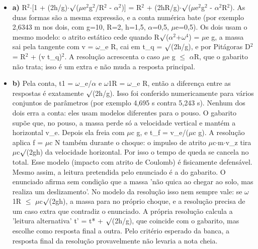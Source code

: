 \documentclass{article}%
\begin{document}
\begin{itemize}%
\item%
\textbf{a)} R$^2$$\cdot${[}1 + (2h/g)$\cdot$$\surd$($\mu$e$^2$g$^2$/R$^2$ - $\alpha$$^2$){]} = R$^2$ + (2hR/g)$\cdot$$\surd$($\mu$e$^2$g$^2$ - $\alpha$$^2$R$^2$). As duas formas são a mesma expressão, e a conta numérica bate (por exemplo 2,6343 m nos dois, com g=10, R=2, h=1,5, $\alpha$=0,5, $\mu$e=0,5). Os dois usam o mesmo modelo: o atrito estático cede quando R$\surd$($\alpha$$^2$+$\omega$$^{4}$) = $\mu$e g, a massa sai pela tangente com v = $\omega$\_e R, cai em t\_q = $\surd$(2h/g), e por Pitágoras D$^2$ = R$^2$ + (v t\_q)$^2$. A resolução acrescenta o caso $\mu$e g $\leq$ $\alpha$R, que o gabarito não trata; isso é um extra e não muda a resposta principal.%
\item%
\textbf{b)} Pela conta, t1 = $\omega$\_e/$\alpha$ e $\omega$1R = $\omega$\_e R, então a diferença entre as respostas é exatamente $\surd$(2h/g). Isso foi conferido numericamente para vários conjuntos de parâmetros (por exemplo 4,695 s contra 5,243 s). Nenhum dos dois erra a conta: eles usam modelos diferentes para o pouso. O gabarito supõe que, no pouso, a massa perde só a velocidade vertical e mantém a horizontal v\_e. Depois ela freia com $\mu$c g, e t\_f = v\_e/($\mu$c g). A resolução aplica f = $\mu$c N também durante o choque: o impulso de atrito $\mu$c$\cdot$m$\cdot$v\_z tira $\mu$c$\surd$(2gh) da velocidade horizontal. Por isso o tempo de queda se cancela no total. Esse modelo (impacto com atrito de Coulomb) é fisicamente defensável. Mesmo assim, a leitura pretendida pelo enunciado é a do gabarito. O enunciado afirma sem condição que a massa 'não quica ao chegar ao solo, mas realiza um deslizamento'. No modelo da resolução isso nem sempre vale: se $\omega$1R $\leq$ $\mu$c$\surd$(2gh), a massa para no próprio choque, e a resolução precisa de um caso extra que contradiz o enunciado. A própria resolução calcula a 'leitura alternativa' t' = t* + $\surd$(2h/g), que coincide com o gabarito, mas escolhe como resposta final a outra. Pelo critério esperado da banca, a resposta final da resolução provavelmente não levaria a nota cheia.%
\end{itemize}%
\end{document}
